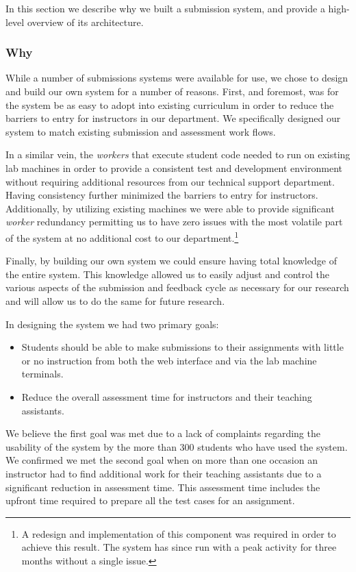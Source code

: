 In this section we describe why we built a submission system, and provide a
high-level overview of its architecture.

\subsubsection{Why}
While a number of submissions systems were available for use, we chose to
design and build our own system for a number of reasons. First, and foremost,
was for the system be as easy to adopt into existing curriculum in order to
reduce the barriers to entry for instructors in our department. We specifically
designed our system to match existing submission and assessment work flows.

In a similar vein, the \emph{workers} that execute student code needed to run
on existing lab machines in order to provide a consistent test and development
environment without requiring additional resources from our technical support
department. Having consistency further minimized the barriers to entry for
instructors. Additionally, by utilizing existing machines we were able to
provide significant \emph{worker} redundancy permitting us to have zero issues
with the most volatile part of the system at no additional cost to our
department.\footnote{A redesign and implementation of this component was
  required in order to achieve this result. The system has since run with a
  peak activity for three months without a single issue.}

Finally, by building our own system we could ensure having total knowledge of
the entire system. This knowledge allowed us to easily adjust and control the
various aspects of the submission and feedback cycle as necessary for our
research and will allow us to do the same for future research.

In designing the system we had two primary goals:

\begin{itemize}
\item Students should be able to make submissions to their assignments with
  little or no instruction from both the web interface and via the lab machine
  terminals.
\item Reduce the overall assessment time for instructors and their teaching
  assistants.
\end{itemize}

We believe the first goal was met due to a lack of complaints regarding the
usability of the system by the more than 300 students who have used the
system. We confirmed we met the second goal when on more than one occasion an
instructor had to find additional work for their teaching assistants due to a
significant reduction in assessment time. This assessment time includes the
upfront time required to prepare all the test cases for an assignment.


